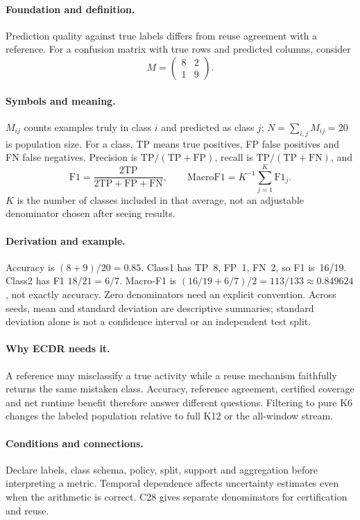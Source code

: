 \paragraph{Foundation and definition.}
Prediction quality against true labels differs from reuse agreement with
a reference. For a confusion matrix with true rows and predicted columns,
consider
\[
 M=\begin{pmatrix}8&2\\1&9\end{pmatrix}.
\]
\paragraph{Symbols and meaning.}
$M_{ij}$ counts examples truly in class $i$ and predicted as class $j$;
$N=\sum_{i,j}M_{ij}=20$ is population size. For a class, TP means true
positives, FP false positives and FN false negatives. Precision is
$\mathrm{TP}/(\mathrm{TP}+\mathrm{FP})$, recall is
$\mathrm{TP}/(\mathrm{TP}+\mathrm{FN})$, and
\[
 \mathrm{F1}=\frac{2\mathrm{TP}}{2\mathrm{TP}+\mathrm{FP}+\mathrm{FN}},
 \qquad \mathrm{MacroF1}=K^{-1}\sum_{j=1}^{K}\mathrm{F1}_j.
\]
$K$ is the number of classes included in that average, not an adjustable
denominator chosen after seeing results.
\paragraph{Derivation and example.}
Accuracy is $(8+9)/20=0.85$. Class1 has TP~8, FP~1, FN~2, so F1 is~16/19.
Class2 has F1 $18/21=6/7$. Macro-F1 is
$(16/19+6/7)/2=113/133\approx0.849624$, not exactly accuracy.
Zero denominators need an explicit convention. Across seeds, mean and
standard deviation are descriptive summaries; standard deviation alone
is not a confidence interval or an independent test split.
\paragraph{Why ECDR needs it.}
A reference may misclassify a true activity while a reuse mechanism
faithfully returns the same mistaken class. Accuracy, reference agreement,
certified coverage and net runtime benefit therefore answer different
questions. Filtering to pure K6 changes the labeled population relative
to full K12 or the all-window stream.
\paragraph{Conditions and connections.}
Declare labels, class schema, policy, split, support and aggregation before
interpreting a metric. Temporal dependence affects uncertainty estimates
even when the arithmetic is correct. C28 gives separate denominators for
certification and reuse.
